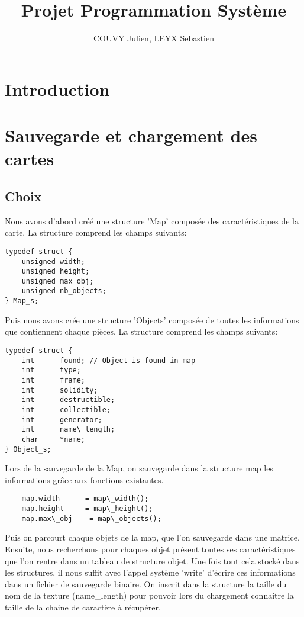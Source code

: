 \documentclass[a4paper]{article}
\title{Projet Programmation Système}
\author{COUVY Julien, LEYX Sebastien}
\begin{document}
\maketitle

\section{Introduction}


\section{Sauvegarde et chargement des cartes}
\subsection{Choix}
Nous avons d'abord créé une structure 'Map' composée des caractéristiques de la carte. La structure comprend les champs suivants:

\begin{verbatim}
typedef struct {
    unsigned width;
    unsigned height;
    unsigned max_obj;
    unsigned nb_objects;
} Map_s;
\end{verbatim}

Puis nous avons crée une structure 'Objects' composée de toutes les informations que contiennent chaque pièces. La structure comprend les champs suivants:
\begin{verbatim}
typedef struct {
    int      found; // Object is found in map
    int      type;
    int      frame;
    int      solidity;
    int      destructible;
    int      collectible;
    int      generator;
    int      name\_length;
    char     *name;
} Object_s;
\end{verbatim}

Lors de la sauvegarde de la Map, on sauvegarde dans la structure map les informations grâce aux fonctions existantes.

\begin{verbatim}
    map.width      = map\_width();
    map.height     = map\_height();
    map.max\_obj    = map\_objects();
\end{verbatim}   

Puis on parcourt chaque objets de la map, que l'on sauvegarde dans une matrice. Ensuite, nous recherchons pour chaques objet présent toutes ses caractéristiques que l'on rentre dans un tableau de structure objet. Une fois tout cela stocké dans les structures, il nous suffit avec l'appel système 'write' d'écrire ces informations dans un fichier de sauvegarde binaire. On inscrit dans la structure la taille du nom de la texture (name\_length) pour pouvoir lors du chargement connaitre la taille de la chaine de caractère à récupérer.
\end{document}
